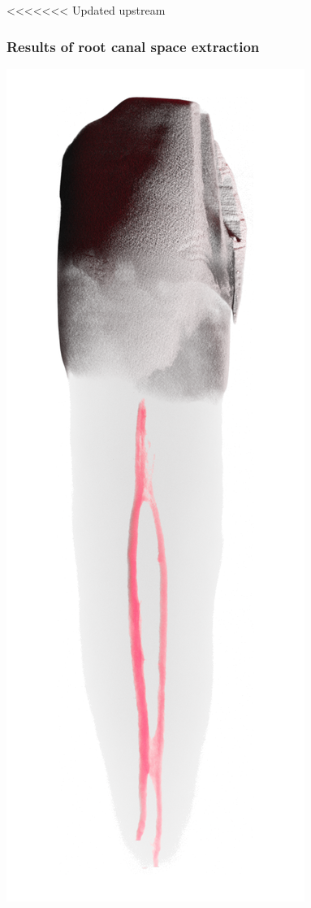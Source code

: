 \begin{frame}
\begin{frame}
<<<<<<< Updated upstream
	\frametitle{Results of root canal space extraction}%
		\includegraphics[height=\imheight]{./images/zmk/rcs/Tooth0452}%

\end{frame}
\end{frame}
